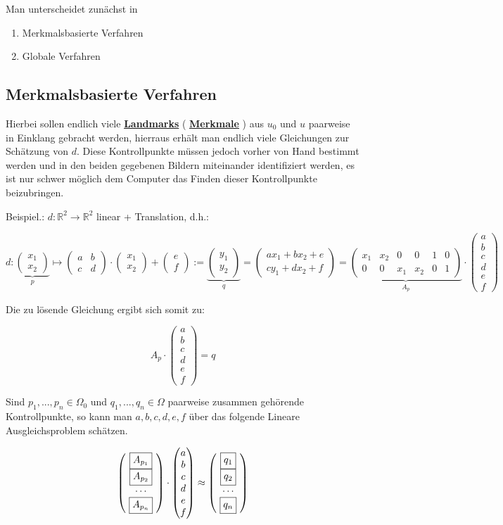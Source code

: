 \documentclass{article}
\theoremstyle{plain}
\theoremstyle{definition}
\numberwithin{equation}{section}
\newcommand{\R}[0] {
\mathbb R
}
\newcommand{\mim}[1] {
\underline{\textbf{#1\index{#1}}}
}
\newcommand{\C}[0]{
    \cdot
}
\newcommand{\mat}[1] {
\begin{pmatrix} #1 \end{pmatrix}
}
\begin{document}
Man unterscheidet zunächst in

\begin{enumerate}
    \item[\textbullet] Merkmalsbasierte Verfahren
    \item[\textbullet] Globale Verfahren
\end{enumerate}

\subsection{Merkmalsbasierte Verfahren}

Hierbei sollen endlich viele \mim{Landmarks}(\mim{Merkmale}) aus $u_0$ und $u$ paarweise in Einklang gebracht werden, hierraus erhält man endlich viele Gleichungen zur Schätzung von $d$. Diese Kontrollpunkte müssen jedoch vorher von Hand bestimmt werden und in den beiden gegebenen Bildern miteinander identifiziert werden, es ist nur schwer möglich dem Computer das Finden dieser Kontrollpunkte beizubringen.

Beispiel.: $d:\R^2 \to \R^2$ linear + Translation, d.h.:

\[ d:\underbrace{\mat{x_1 \\ x_2}}_{p} \mapsto \mat{a & b \\ c & d} \C \mat{x_1 \\ x_2}+ \mat{e\\f}:=\underbrace{\mat{y_1 \\ y_2}}_{q} = \mat{ax_1 + bx_2 +e\\ cy_1 + dx_2 + f} = \underbrace{\mat{x_1 & x_2 & 0 & 0 & 1 & 0\\ 0 & 0 & x_1 & x_2 & 0 & 1}}_{A_p}\C \mat{a\\b\\c\\d\\e\\f}\]

Die zu lösende Gleichung ergibt sich somit zu:

\[A_p \C \mat{a\\b\\c\\d\\e\\f} = q\]

Sind $p_1,...,p_n \in \Omega_0$ und $q_1,...,q_n \in \Omega$ paarweise zusammen gehörende Kontrollpunkte, so kann man $a,b,c,d,e,f$ über das folgende Lineare Ausgleichsproblem schätzen.

\[ \mat{\ \boxed{A_{p_1}} \ \\ \ \boxed{A_{p_2}} \ \\ \cdots \\ \ \boxed{A_{p_n}} \ } \C \mat{a\\b\\c\\d\\e\\f} \approx \mat{\ \boxed{q_1 \vphantom{A_{p_1}}} \ \\ \ \boxed{q_2 \vphantom{A_{p_1}}} \ \\ \cdots \\ \ \boxed{q_n \vphantom{A_{p_1}}} \ }\]
\end{document}
